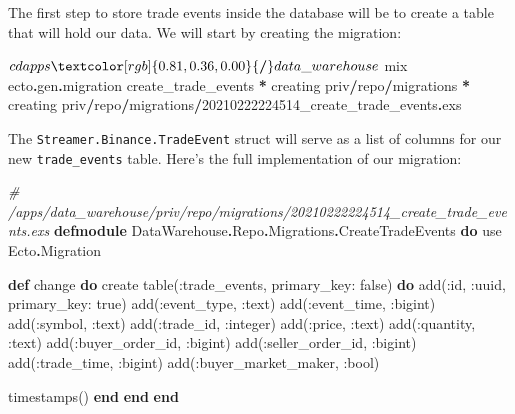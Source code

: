 \documentclass[
  oneside]{book}
\newenvironment{Shaded}{\begin{snugshade}}{\end{snugshade}}
\newcommand{\CommentTok}[1]{\textcolor[rgb]{0.56,0.35,0.01}{\textit{#1}}}
\newcommand{\ConstantTok}[1]{\textcolor[rgb]{0.00,0.00,0.00}{#1}}
\newcommand{\DecValTok}[1]{\textcolor[rgb]{0.00,0.00,0.81}{#1}}
\newcommand{\ImportTok}[1]{#1}
\newcommand{\KeywordTok}[1]{\textcolor[rgb]{0.13,0.29,0.53}{\textbf{#1}}}
\newcommand{\NormalTok}[1]{#1}
\newcommand{\OperatorTok}[1]{\textcolor[rgb]{0.81,0.36,0.00}{\textbf{#1}}}
\newcommand{\VariableTok}[1]{\textcolor[rgb]{0.00,0.00,0.00}{#1}}
\begin{document}
The first step to store trade events inside the database will be to create a table that will hold our data. We will start by creating the migration:

\begin{Shaded}
\begin{Highlighting}[]
\NormalTok{$ cd apps}\OperatorTok{/}\NormalTok{data\_warehouse}
\NormalTok{$ mix ecto}\OperatorTok{.}\NormalTok{gen}\OperatorTok{.}\NormalTok{migration create\_trade\_events}
\OperatorTok{*}\NormalTok{ creating priv}\OperatorTok{/}\NormalTok{repo}\OperatorTok{/}\NormalTok{migrations}
\OperatorTok{*}\NormalTok{ creating priv}\OperatorTok{/}\NormalTok{repo}\OperatorTok{/}\NormalTok{migrations}\OperatorTok{/}\DecValTok{2}\NormalTok{0210222224514\_create\_trade\_events}\OperatorTok{.}\NormalTok{exs}
\end{Highlighting}
\end{Shaded}

The \texttt{Streamer.Binance.TradeEvent} struct will serve as a list of columns for our new \texttt{trade\_events} table. Here's the full implementation of our migration:

\begin{Shaded}
\begin{Highlighting}[]
\CommentTok{\# /apps/data\_warehouse/priv/repo/migrations/20210222224514\_create\_trade\_events.exs}
\KeywordTok{defmodule} \ConstantTok{DataWarehouse}\OperatorTok{.}\ConstantTok{Repo}\OperatorTok{.}\ConstantTok{Migrations}\OperatorTok{.}\ConstantTok{CreateTradeEvents} \KeywordTok{do}
  \ImportTok{use} \ConstantTok{Ecto}\OperatorTok{.}\ConstantTok{Migration}

  \KeywordTok{def}\NormalTok{ change }\KeywordTok{do}
\NormalTok{    create table(}\VariableTok{:trade\_events}\NormalTok{, }\VariableTok{primary\_key:} \ConstantTok{false}\NormalTok{) }\KeywordTok{do}
\NormalTok{      add(}\VariableTok{:id}\NormalTok{, }\VariableTok{:uuid}\NormalTok{, }\VariableTok{primary\_key:} \ConstantTok{true}\NormalTok{)}
\NormalTok{      add(}\VariableTok{:event\_type}\NormalTok{, }\VariableTok{:text}\NormalTok{)}
\NormalTok{      add(}\VariableTok{:event\_time}\NormalTok{, }\VariableTok{:bigint}\NormalTok{)}
\NormalTok{      add(}\VariableTok{:symbol}\NormalTok{, }\VariableTok{:text}\NormalTok{)}
\NormalTok{      add(}\VariableTok{:trade\_id}\NormalTok{, }\VariableTok{:integer}\NormalTok{)}
\NormalTok{      add(}\VariableTok{:price}\NormalTok{, }\VariableTok{:text}\NormalTok{)}
\NormalTok{      add(}\VariableTok{:quantity}\NormalTok{, }\VariableTok{:text}\NormalTok{)}
\NormalTok{      add(}\VariableTok{:buyer\_order\_id}\NormalTok{, }\VariableTok{:bigint}\NormalTok{)}
\NormalTok{      add(}\VariableTok{:seller\_order\_id}\NormalTok{, }\VariableTok{:bigint}\NormalTok{)}
\NormalTok{      add(}\VariableTok{:trade\_time}\NormalTok{, }\VariableTok{:bigint}\NormalTok{)}
\NormalTok{      add(}\VariableTok{:buyer\_market\_maker}\NormalTok{, }\VariableTok{:bool}\NormalTok{)}

\NormalTok{      timestamps()}
    \KeywordTok{end}
  \KeywordTok{end}
\KeywordTok{end}
\end{Highlighting}
\end{Shaded}
\end{document}

